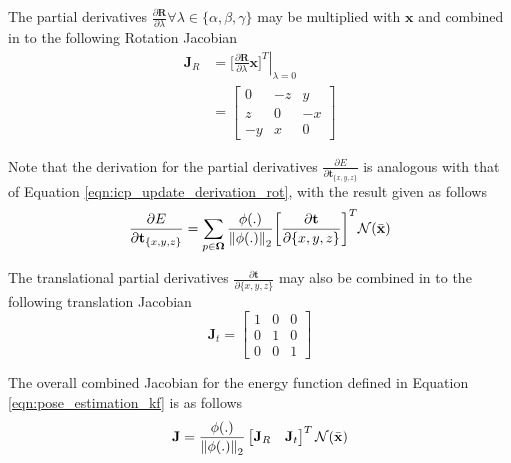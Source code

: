 The partial derivatives
$\frac{\partial \mathbf{R}}{\partial \lambda} \forall \lambda \in \{\alpha, \beta, \gamma\}$ 
may be multiplied with $\mathbf{x}$ and combined in to the following Rotation Jacobian
\begin{align}
  \label{eqn:rot_jac}
  \mathbf{J}_{R} & = \left. \bigg[
    \frac{\partial \mathbf{R}}{\partial \lambda} \mathbf{x}
    \bigg]^{T} \right\vert_{\lambda = 0} \\
  & =
  \begin{bmatrix}
    0 & -z & y \\
    z & 0 & -x \\
    -y & x & 0
  \end{bmatrix}
\end{align}

Note that the derivation for the partial derivatives
$\frac{\partial E}{\partial \mathbf{t}_{\{x, y, z\}}}$ is analogous with that of
Equation \ref{eqn:icp_update_derivation_rot}, with the result given as follows
\begin{equation}
  \label{eqn:icp_update_derivation_trans}
  \frac{\partial E}{\partial \mathbf{t}_{\{x, y, z\}}} =
  \sum_{p \in \mathbf{\Omega}}
  \frac{\phi(.)}{\left\lVert\phi(.)\right\rVert_{2}}
  \bigg[ \frac{\partial \mathbf{t}}{\partial \{x, y, z\}}\bigg]^{T}
  \mathcal{N}(\bar{\mathbf{x}})
\end{equation}

The translational partial derivatives
$\frac{\partial \mathbf{t}}{\partial \{x, y, z\}}$ may also be combined in to
the following translation Jacobian
\begin{equation}
  \label{eqn:trans_jac}
  \mathbf{J}_{t} =
  \begin{bmatrix}
    1 & 0 & 0 \\
    0 & 1 & 0 \\
    0 & 0 & 1
  \end{bmatrix}
\end{equation}

The overall combined Jacobian for the energy function defined in Equation
\ref{eqn:pose_estimation_kf} is as follows
\begin{equation}
  \label{eqn:pose_jacobian}
  \mathbf{J} =
  \frac{\phi(.)}{\left\lVert\phi(.)\right\rVert_{2}}
  \begin{bmatrix}
    \mathbf{J}_{R} & \mathbf{J}_{t}
  \end{bmatrix}^{T}
  \mathcal{N}(\bar{\mathbf{x}})
\end{equation}

